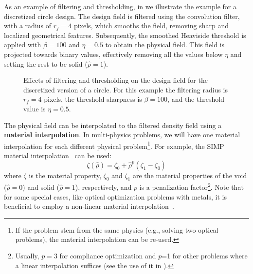     As an example of filtering and thresholding, in 
     we illustrate the example for a discretized circle design.
    The design field is filtered using the convolution filter, with a radius of $r_f=4$ pixels, which smooths the field, removing sharp and localized
    geometrical features. Subsequently, the smoothed Heaviside threshold is applied with $\beta=100$ and $\eta=0.5$ to obtain the physical field. This field is projected towards binary 
    values, effectively removing all the values below $\eta$ and setting the rest to be solid ($\hat{\rho}=1$).

    \begin{figure}[tb]
        \centering

        \caption{Effects of filtering and thresholding on the design field for the discretized
        version of a circle. For this example the filtering radius is $r_f=4$ pixels, the threshold sharpness is 
        $\beta=100$, and the threshold value is $\eta=0.5$.}
        \label{fig:ft}
    \end{figure}

    The physical field can be interpolated to the filtered density field using a
    \textbf{material interpolation}.
    In multi-physics problems, we will have one material interpolation for each
    different physical problem\footnote{If the problem stem from the same physics
        (e.g., solving two optical problems), the material interpolation can be
        re-used.}.
    For example, the SIMP material interpolation~\cite{SIMP} can be used:
    \begin{equation}
        \zeta(\hat{\rho})=\zeta_0+\hat{\rho}^p\left(\zeta_1-\zeta_0\right)
    \end{equation}
    where $\zeta$ is the material property, $\zeta_0$ and $\zeta_1$ are the
    material properties of the void ($\hat{\rho}=0$) and solid ($\hat{\rho}=1$), respectively, and $p$
    is a penalization factor\footnote{Usually, $p=3$ for compliance optimization and $p$=1
    for other problems where a linear interpolation suffices (see the use of it in \cite{ownpub3,ownpub4}).}. Note that for some
    special cases, like optical optimization problems with metals, it is beneficial
    to employ a non-linear material interpolation~\cite{nonlinear_interp,ownpub0}.

